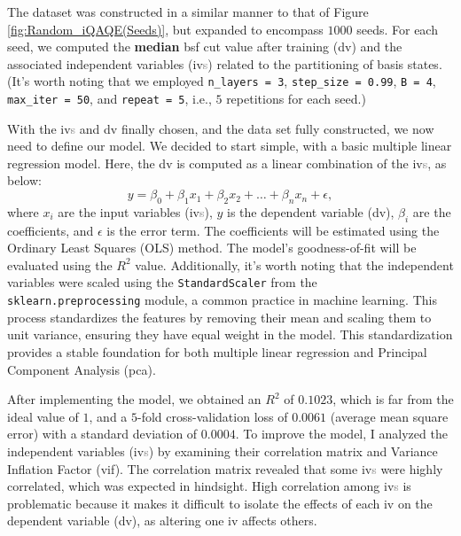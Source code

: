 The dataset was constructed in a similar manner to that of Figure \ref{fig:Random_iQAQE(Seeds)}, but expanded to encompass $1000$ seeds. For each seed, we computed the \textbf{median} \acrshort{bsf} cut value after training (\acrshort{dv}) and the associated independent variables (\acrshort{iv}\textcolor{gray}{s}) related to the partitioning of basis states. (It's worth noting that we employed \texttt{n\_layers = 3}, \texttt{step\_size = 0.99}, \texttt{B = 4}, \texttt{max\_iter = 50}, and \texttt{repeat = 5}, i.e., $5$ repetitions for each seed.)

With the \acrshort{iv}\textcolor{gray}{s} and \acrshort{dv} finally chosen, and the data set fully constructed, we now need to define our model. We decided to start simple, with a basic multiple linear regression model. Here, the \acrshort{dv} is computed as a linear combination of the \acrshort{iv}\textcolor{gray}{s}, as below:
\begin{equation}
    y = \beta_0 + \beta_1 x_1 + \beta_2 x_2 + \ldots + \beta_n x_n + \epsilon,
\end{equation}
where $x_i$ are the input variables (\acrshort{iv}\textcolor{gray}{s}), $y$ is the dependent variable (\acrshort{dv}), $\beta_i$ are the coefficients, and $\epsilon$ is the error term. The coefficients will be estimated using the Ordinary Least Squares (OLS) method. The model's goodness-of-fit will be evaluated using the $R^2$ value. Additionally, it's worth noting that the independent variables were scaled using the \texttt{StandardScaler} from the \texttt{sklearn.preprocessing} module, a common practice in machine learning. This process standardizes the features by removing their mean and scaling them to unit variance, ensuring they have equal weight in the model. This standardization provides a stable foundation for both multiple linear regression and Principal Component Analysis (\acrshort{pca}).

After implementing the model, we obtained an $R^2$ of $0.1023$, which is far from the ideal value of $1$, and a $5$-fold cross-validation loss of $0.0061$ (average mean square error) with a standard deviation of $0.0004$. To improve the model, I analyzed the independent variables (\acrshort{iv}\textcolor{gray}{s}) by examining their correlation matrix and Variance Inflation Factor (\acrshort{vif}). The correlation matrix revealed that some \acrshort{iv}\textcolor{gray}{s} were highly correlated, which was expected in hindsight. High correlation among \acrshort{iv}\textcolor{gray}{s} is problematic because it makes it difficult to isolate the effects of each \acrshort{iv} on the dependent variable (\acrshort{dv}), as altering one \acrshort{iv} affects others.

